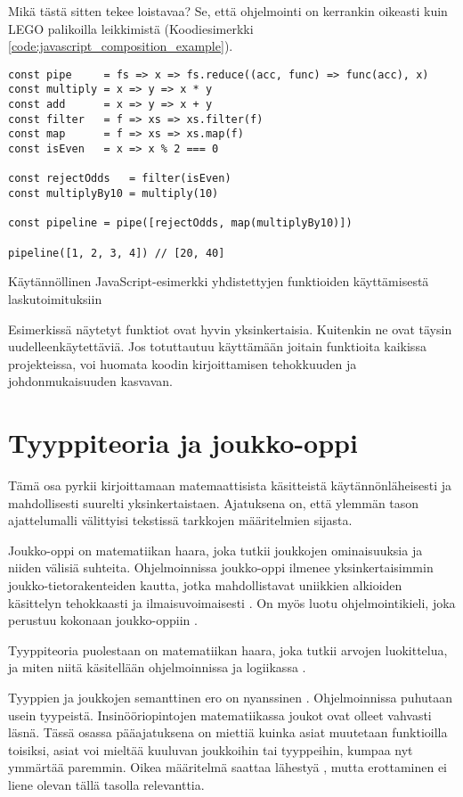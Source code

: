 Mikä tästä sitten tekee loistavaa? Se, että ohjelmointi on kerrankin oikeasti kuin LEGO palikoilla leikkimistä (Koodiesimerkki \ref{code:javascript_composition_example}).

\begin{code}
    \begin{verbatim}
const pipe     = fs => x => fs.reduce((acc, func) => func(acc), x)
const multiply = x => y => x * y
const add      = x => y => x + y
const filter   = f => xs => xs.filter(f)
const map      = f => xs => xs.map(f)
const isEven   = x => x % 2 === 0

const rejectOdds   = filter(isEven)
const multiplyBy10 = multiply(10)

const pipeline = pipe([rejectOdds, map(multiplyBy10)])

pipeline([1, 2, 3, 4]) // [20, 40]
\end{verbatim}
    \caption{Käytännöllinen JavaScript-esimerkki yhdistettyjen funktioiden käyttämisestä laskutoimituksiin}
    \label{code:javascript_composition_example}
\end{code}

Esimerkissä näytetyt funktiot ovat hyvin yksinkertaisia. Kuitenkin ne ovat täysin uudelleenkäytettäviä. Jos totuttautuu käyttämään joitain funktioita kaikissa projekteissa, voi huomata koodin kirjoittamisen tehokkuuden ja johdonmukaisuuden kasvavan.

\section{Tyyppiteoria ja joukko-oppi}
Tämä osa pyrkii kirjoittamaan matemaattisista käsitteistä käytännönläheisesti ja mahdollisesti suurelti yksinkertaistaen. Ajatuksena on, että ylemmän tason ajattelumalli välittyisi tekstissä tarkkojen määritelmien sijasta.

Joukko-oppi on matematiikan haara, joka tutkii joukkojen ominaisuuksia ja niiden välisiä suhteita. Ohjelmoinnissa joukko-oppi ilmenee yksinkertaisimmin joukko-tietorakenteiden kautta, jotka mahdollistavat uniikkien alkioiden käsittelyn tehokkaasti ja ilmaisuvoimaisesti \cite{mdn_set,mdn_set_methods}. On myös luotu ohjelmointikieli, joka perustuu kokonaan joukko-oppiin \cite{SETL_SET_LANGUAGE}.

Tyyppiteoria puolestaan on matematiikan haara, joka tutkii arvojen luokittelua, ja miten niitä käsitellään ohjelmoinnissa ja logiikassa \cite{type_theory,algebraic_data_types}.

Tyyppien ja joukkojen semanttinen ero on nyanssinen \cite{type_vs_set}. Ohjelmoinnissa puhutaan usein tyypeistä. Insinööriopintojen matematiikassa joukot ovat olleet vahvasti läsnä. Tässä osassa pääajatuksena on miettiä kuinka asiat muutetaan funktioilla toisiksi, asiat voi mieltää kuuluvan joukkoihin tai tyyppeihin, kumpaa nyt ymmärtää paremmin. Oikea määritelmä saattaa lähestyä , mutta erottaminen ei liene olevan tällä tasolla relevanttia.

